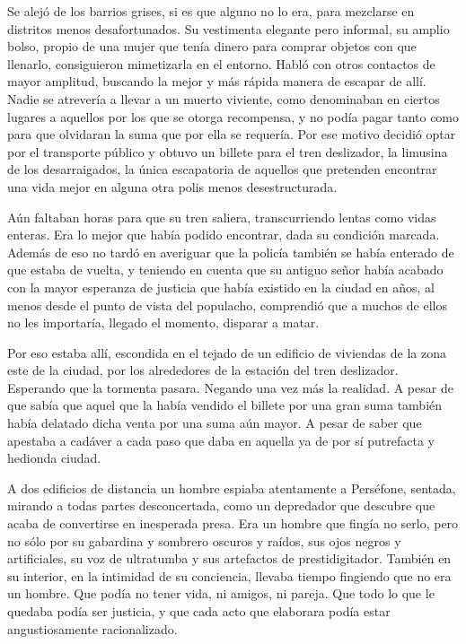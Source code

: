 Se alejó de los barrios grises, si es que alguno no lo era, para mezclarse en distritos menos desafortunados. Su vestimenta elegante pero informal, su amplio bolso, propio de una mujer que tenía dinero para comprar objetos con que llenarlo, consiguieron mimetizarla en el entorno. Habló con otros contactos de mayor amplitud, buscando la mejor y más rápida manera de escapar de allí. Nadie se atrevería a llevar a un muerto viviente, como denominaban en ciertos lugares a aquellos por los que se otorga recompensa, y no podía pagar tanto como para que olvidaran la suma que por ella se requería. Por ese motivo decidió optar por el transporte público y obtuvo un billete para el tren deslizador, la limusina de los desarraigados, la única escapatoria de aquellos que pretenden encontrar una vida mejor en alguna otra polis menos desestructurada.

Aún faltaban horas para que su tren saliera, transcurriendo lentas como vidas enteras. Era lo mejor que había podido encontrar, dada su condición marcada. Además de eso no tardó en averiguar que la policía también se había enterado de que estaba de vuelta, y teniendo en cuenta que su antiguo señor había acabado con la mayor esperanza de justicia que había existido en la ciudad en años, al menos desde el punto de vista del populacho, comprendió que a muchos de ellos no les importaría, llegado el momento, disparar a matar.

Por eso estaba allí, escondida en el tejado de un edificio de viviendas de la zona este de la ciudad, por los alrededores de la estación del tren deslizador. Esperando que la tormenta pasara. Negando una vez más la realidad. A pesar de que sabía que aquel que la había vendido el billete por una gran suma también había delatado dicha venta por una suma aún mayor. A pesar de saber que apestaba a cadáver a cada paso que daba en aquella ya de por sí putrefacta y hedionda ciudad.

A dos edificios de distancia un hombre espiaba atentamente a Perséfone, sentada, mirando a todas partes desconcertada, como un depredador que descubre que acaba de convertirse en inesperada presa. Era un hombre que fingía no serlo, pero no sólo por su gabardina y sombrero oscuros y raídos, sus ojos negros y artificiales, su voz de ultratumba y sus artefactos de prestidigitador. También en su interior, en la intimidad de su conciencia, llevaba tiempo fingiendo que no era un hombre. Que podía no tener vida, ni amigos, ni pareja. Que todo lo que le quedaba podía ser justicia, y que cada acto que elaborara podía estar angustiosamente racionalizado.

